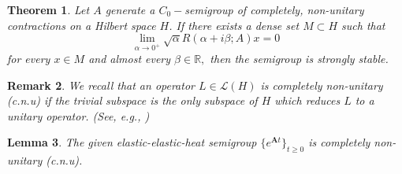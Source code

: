 \documentclass[11pt]{article}
\newtheorem{theorem}{Theorem}
\newtheorem{lemma}[theorem]{Lemma}
\newtheorem{remark}[theorem]{Remark}
\begin{document}
\begin{theorem}
\label{C-T} Let $A$ generate a $C_{0}-$semigroup of completely, non-unitary
contractions on a Hilbert space $H$. If there exists a dense set $M\subset H$
such that%
\begin{equation}
\lim_{\alpha \rightarrow 0^{+}}\sqrt{\alpha }R(\alpha +i\beta ;A)x=0
\label{oniki-5}
\end{equation}%
for every $x\in M$ and almost every $\beta \in 
\mathbb{R}
,$ then the semigroup is strongly stable.
\end{theorem}

\begin{remark}
We recall that an operator $L\in \mathcal{L}(H)$ is completely non-unitary
(c.n.u) if the trivial subspace is the only subspace of $H$ which reduces $L$
to a unitary operator. (See, e.g., \cite{Levan})
\end{remark}

\begin{lemma}
\label{cnu} The given elastic-elastic-heat semigroup $\{e^{\mathbf{A}t}\}_{t\geq 0}$ 
is completely non-unitary (c.n.u).
\end{lemma}
\end{document}
